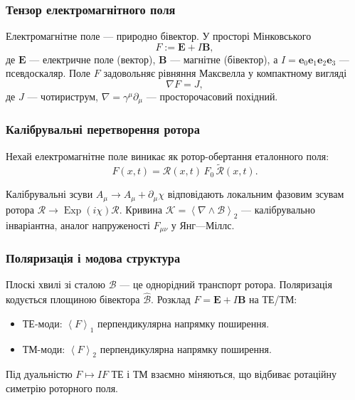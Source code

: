 \documentclass[11pt,a4paper]{article}
\newcommand{\e}{\mathbf{e}}
\newcommand{\grade}[2]{\left\langle #1 \right\rangle_{#2}}
\newcommand{\vecp}[1]{\grade{#1}{1}}
\newcommand{\biv}[1]{\grade{#1}{2}}
\newcommand{\rev}[1]{\widetilde{#1}}           %
\newcommand{\Exp}{\operatorname{Exp}}
\newcommand{\Rotor}{\mathcal{R}}
\newcommand{\Biv}{\mathcal{B}}
\newcommand{\D}{\nabla}                        %
\theoremstyle{definition}
\theoremstyle{plain}
\theoremstyle{remark}
\begin{document}
\subsubsection{Тензор електромагнітного поля}

Електромагнітне поле — природно бівектор. У просторі Мінковського
\begin{equation}
F := \mathbf{E} + I\mathbf{B},
\end{equation}
де $\mathbf{E}$ — електричне поле (вектор), $\mathbf{B}$ — магнітне (бівектор), а $I = \e_0\e_1\e_2\e_3$ — псевдоскаляр. Поле $F$ задовольняє рівняння Максвелла у компактному вигляді
\begin{equation}
\D F = J,
\end{equation}
де $J$ — чотириструм, $\D = \gamma^\mu \partial_\mu$ — просторочасовий похідний.

\subsubsection{Калібрувальні перетворення ротора}

Нехай електромагнітне поле виникає як ротор-обертання еталонного поля:
\begin{equation}
F(x,t) = \Rotor(x,t)\, F_0\, \rev{\Rotor}(x,t).
\end{equation}

Калібрувальні зсуви $A_\mu \to A_\mu + \partial_\mu \chi$ відповідають локальним фазовим зсувам ротора $\Rotor \to \Exp(i\chi)\Rotor$. Кривина $\mathcal{K} = \biv{\D \wedge \Biv}$ — калібрувально інваріантна, аналог напруженості $F_{\mu\nu}$ у Янг—Міллс.

\subsubsection{Поляризація і модова структура}

Плоскі хвилі зі сталою $\Biv$ — це однорідний транспорт ротора. Поляризація кодується площиною бівектора $\hat{\Biv}$. Розклад $F = \mathbf{E} + I\mathbf{B}$ на ТЕ/ТМ:
\begin{itemize}
  \item ТЕ-моди: $\vecp{F}$ перпендикулярна напрямку поширення.
  \item ТМ-моди: $\biv{F}$ перпендикулярна напрямку поширення.
\end{itemize}

Під дуальністю $F \mapsto IF$ ТЕ і ТМ взаємно міняються, що відбиває ротаційну симетрію роторного поля.
\end{document}
